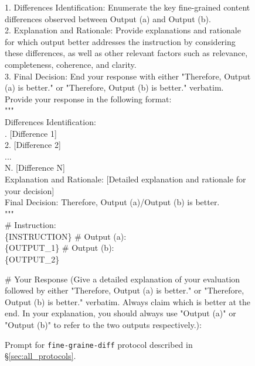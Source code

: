 \begin{figure*}[t!]
\begin{tcolorbox}[colback=black!3!white, colframe=black!70!white, title=Fine-grained-diff, fontupper=\footnotesize, fonttitle=\footnotesize]
1. Differences Identification: Enumerate the key fine-grained content differences observed between Output (a) and Output (b).\\
2. Explanation and Rationale: Provide explanations and rationale for which output better addresses the instruction by considering these differences, as well as other relevant factors such as relevance, completeness, coherence, and clarity.\\
3. Final Decision: End your response with either "Therefore, Output (a) is better." or "Therefore, Output (b) is better." verbatim.\\
\newline
Provide your response in the following format:\\
"""\\
Differences Identification: \\
. [Difference 1] \\
2. [Difference 2] \\
... \\
N. [Difference N] \\
\newline
Explanation and Rationale: [Detailed explanation and rationale for your decision] \\

Final Decision: Therefore, Output (a)/Output (b) is better. \\
"""\\

\# Instruction: \\
\{INSTRUCTION\}
\newline
\newline
\# Output (a): \\
\{OUTPUT\_1\}
\newline
\newline
\# Output (b): \\
\{OUTPUT\_2\}
\newline

\# Your Response (Give a detailed explanation of your evaluation followed by either "Therefore, Output (a) is better." or "Therefore, Output (b) is better." verbatim. Always claim which is better at the end. In your explanation, you should always use "Output (a)" or "Output (b)" to refer to the two outputs respectively.):

\end{tcolorbox}
\caption{Prompt for \texttt{fine-graine-diff} protocol described in \S\ref{sec:all_protocols}.}
\label{fig:prompt_finegrained_differences}
\end{figure*}






